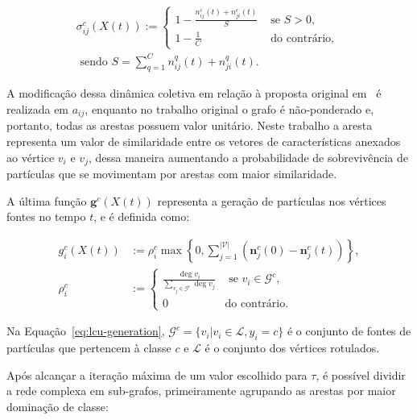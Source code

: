 \begin{equation}\label{eq:lcu-sigma}
\begin{aligned}
\sigma_{i j}^c(X(t)):= \begin{cases}1-\frac{n_{i j}^c(t)+n_{j i}^c(t)}{S} & \text { se } S>0, \\
1-\frac{1}{C} & \text { do contrário, }\end{cases} \\
\text { sendo } S=\sum_{q=1}^C n_{i j}^q(t)+n_{j i}^q(t) .
\end{aligned}
\end{equation}

A modificação dessa dinâmica coletiva em relação à proposta original
em~\cite{VerriNetworkUnfoldingMap2018} é realizada em $a_{ij}$,
enquanto no trabalho original o grafo é não-ponderado e, portanto,
todas as arestas possuem valor unitário. Neste trabalho a aresta representa um
valor de similaridade entre os vetores de características anexados ao
vértice $v_i$ e $v_j$, dessa maneira aumentando a probabilidade de
sobrevivência de partículas que se movimentam por arestas com maior
similaridade.

A última função $\mathbf{g}^c(X(t))$ representa a geração de
partículas nos vértices fontes no tempo $t$, e é definida como:

\begin{equation}\label{eq:lcu-generation}
  \begin{aligned}
    g_i^c(X(t)) &:=\rho_i^c \max \left\{0, \sum_{j=1}^{\left| \mathcal{V} \right|}(\mathbf{n}_{j}^c(0) - \mathbf{n}_{j}^c(t))\right\}, \\
    \rho_i^c &:= \begin{cases}\frac{\deg v_i}{\sum_{v_j \in \mathcal{G}^c}
      \deg v_j} & \text { se } v_i \in \mathcal{G}^c, \\ 0 & \text {
                                                               do contrário. }\end{cases}
  \end{aligned}
\end{equation}

Na Equação~\ref{eq:lcu-generation}, $\mathcal{G}^c = \{v_i |v_i \in \mathcal{L}, y_i = c\}$
é o conjunto de fontes de partículas que pertencem à classe $c$ e $\mathcal{L}$
é o conjunto dos vértices rotulados.


Após alcançar a iteração máxima de um valor escolhido para $ \tau $, é possível
dividir a rede complexa em sub-grafos, primeiramente agrupando as
arestas por maior dominação de classe:

